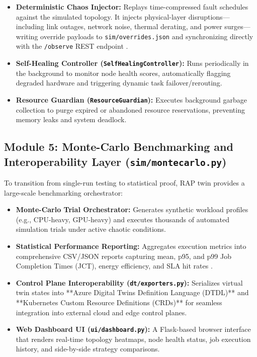 \documentclass[twoside,twocolumn,10pt]{article}
\begin{document}
\begin{itemize}
    \item \textbf{Deterministic Chaos Injector:} Replays time-compressed fault schedules against the simulated topology. It injects physical-layer disruptions—including link outages, network noise, thermal derating, and power surges—writing override payloads to \texttt{sim/overrides.json} and synchronizing directly with the \texttt{/observe} REST endpoint \cite{poltronieri2021}.
    \item \textbf{Self-Healing Controller (\texttt{SelfHealingController}):} Runs periodically in the background to monitor node health scores, automatically flagging degraded hardware and triggering dynamic task failover/rerouting.
    \item \textbf{Resource Guardian (\texttt{ResourceGuardian}):} Executes background garbage collection to purge expired or abandoned resource reservations, preventing memory leaks and system deadlock.
\end{itemize}

\subsection{Module 5: Monte-Carlo Benchmarking and Interoperability Layer (\texttt{sim/montecarlo.py})}
To transition from single-run testing to statistical proof, RAP twin provides a large-scale benchmarking orchestrator:

\begin{itemize}
    \item \textbf{Monte-Carlo Trial Orchestrator:} Generates synthetic workload profiles (e.g., CPU-heavy, GPU-heavy) and executes thousands of automated simulation trials under active chaotic conditions.
    \item \textbf{Statistical Performance Reporting:} Aggregates execution metrics into comprehensive CSV/JSON reports capturing mean, p95, and p99 Job Completion Times (JCT), energy efficiency, and SLA hit rates \cite{wang2022}.
    \item \textbf{Control Plane Interoperability (\texttt{dt/exporters.py}):} Serializes virtual twin states into **Azure Digital Twins Definition Language (DTDL)** and **Kubernetes Custom Resource Definitions (CRDs)** for seamless integration into external cloud and edge control planes.
    \item \textbf{Web Dashboard UI (\texttt{ui/dashboard.py}):} A Flask-based browser interface that renders real-time topology heatmaps, node health status, job execution history, and side-by-side strategy comparisons.
\end{itemize}
    
\end{document}
